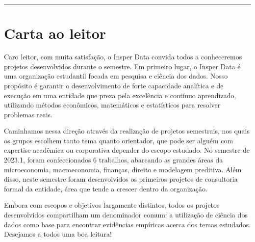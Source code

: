 \documentclass[
    10pt, 
    a4paper, 
    ]{article}
\begin{document}


\tableofcontents

\bigskip\bigskip

\noindent\rule{\linewidth}{.5pt}
\section*{Carta ao leitor}

Caro leitor,
com muita satisfação, o Insper Data convida todos a conheceremos projetos desenvolvidos durante o semestre.
Em primeiro lugar, o Insper Data é uma organização estudantil focada em pesquisa e ciência dos dados. Nosso propósito é garantir o desenvolvimento de forte capacidade analítica e de execução em uma entidade que preza pela excelência e contínuo aprendizado, utilizando métodos econômicos, matemáticos e estatísticos para resolver problemas reais.

Caminhamos nessa direção através da realização de projetos semestrais, nos quais os grupos escolhem tanto tema quanto orientador, que pode ser alguém com expertise acadêmica ou corporativa depender do escopo estudado. No semestre de 2023.1, foram confeccionados 6 trabalhos, abarcando as grandes áreas da microeconomia, macroeconomia, finanças, direito e modelagem preditiva. Além disso, neste semestre foram desenvolvidos os primeiros projetos de consultoria formal da entidade, área que tende a crescer dentro da organização. 

Embora com escopos e objetivos largamente distintos, todos os projetos desenvolvidos compartilham um denominador comum: a utilização de ciência dos dados como base para encontrar evidências empíricas acerca dos temas estudados. Desejamos a todos uma boa leitura!













\clearpage

\nocite{*}

\printbibliography

\appendix
\end{document}

